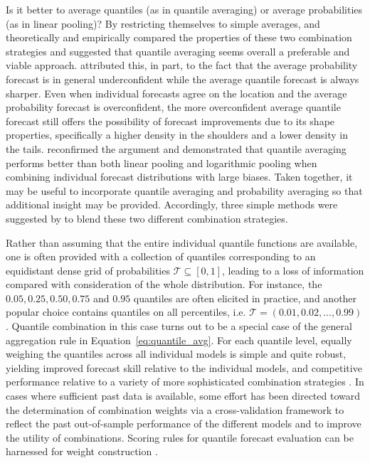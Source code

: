 \documentclass[a4paper,11pt]{article}
\begin{document}
Is it better to average quantiles (as in quantile averaging) or average probabilities (as in linear pooling)? By restricting themselves to simple averages, \citet{Lichtendahl2013-rt} and \citet{Busetti2017-ox} theoretically and empirically compared the properties of these two combination strategies and suggested that quantile averaging seems overall a preferable and viable approach. \citet{Lichtendahl2013-rt} attributed this, in part, to the fact that the average probability forecast is in general underconfident while the average quantile forecast is always sharper. Even when individual forecasts agree on the location and the average probability forecast is overconfident, the more overconfident average quantile forecast still offers the possibility of forecast improvements due to its shape properties, specifically a higher density in the shoulders and a lower density in the tails. \citet{Busetti2017-ox} reconfirmed the argument and demonstrated that quantile averaging performs better than both linear pooling and logarithmic pooling when combining individual forecast distributions with large biases. Taken together, it may be useful to incorporate quantile averaging and probability averaging so that additional insight may be provided. Accordingly, three simple methods were suggested by \citet{Lichtendahl2013-rt} to blend these two different combination strategies.

Rather than assuming that the entire individual quantile functions are available, one is often provided with a collection of quantiles corresponding to an equidistant dense grid of probabilities $\mathcal{T} \subseteq [0,1]$, leading to a loss of information compared with consideration of the whole distribution. For instance, the $0.05, 0.25, 0.50, 0.75$ and $0.95$ quantiles are often elicited in practice, and another popular choice contains quantiles on all percentiles, i.e. $\mathcal{T} = (0.01, 0.02, \ldots, 0.99)$. Quantile combination in this case turns out to be a special case of the general aggregation rule in Equation~\eqref{eq:quantile_avg}. For each quantile level, equally weighing the quantiles across all individual models is simple and quite robust, yielding improved forecast skill relative to the individual models, and competitive performance relative to a variety of more sophisticated combination strategies \citep[e.g.,][]{Busetti2017-ox,Smyl2019-av,Ray2022-co}. In cases where sufficient past data is available, some effort has been directed toward the determination of combination weights via a cross-validation framework to reflect the past out-of-sample performance of the different models and to improve the utility of combinations. Scoring rules for quantile forecast evaluation can be harnessed for weight construction \citep{Gneiting2007-ij,Grushka-Cockayne2017-eg,Trapero2019-uh}.
\end{document}
